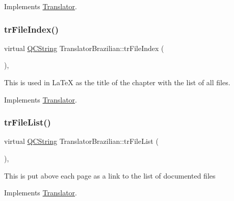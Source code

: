 Implements \mbox{\hyperlink{class_translator}{Translator}}.

\mbox{\label{class_translator_brazilian_ad14b63cfb09207586ed8094d5689e2a5}} 
\subsubsection{\texorpdfstring{trFileIndex()}{trFileIndex()}}
{\footnotesize\ttfamily virtual \mbox{\hyperlink{class_q_c_string}{Q\+C\+String}} Translator\+Brazilian\+::tr\+File\+Index (\begin{DoxyParamCaption}{ }\end{DoxyParamCaption})\hspace{0.3cm}{\ttfamily [inline]}, {\ttfamily [virtual]}}

This is used in La\+TeX as the title of the chapter with the list of all files. 

Implements \mbox{\hyperlink{class_translator}{Translator}}.

\mbox{\label{class_translator_brazilian_a36689b585246169cf960c445f649ad9f}} 
\subsubsection{\texorpdfstring{trFileList()}{trFileList()}}
{\footnotesize\ttfamily virtual \mbox{\hyperlink{class_q_c_string}{Q\+C\+String}} Translator\+Brazilian\+::tr\+File\+List (\begin{DoxyParamCaption}{ }\end{DoxyParamCaption})\hspace{0.3cm}{\ttfamily [inline]}, {\ttfamily [virtual]}}

This is put above each page as a link to the list of documented files 

Implements \mbox{\hyperlink{class_translator}{Translator}}.

\mbox{\label{class_translator_brazilian_a2191dea17856c9cdf05382ed126a6f8f}} 
